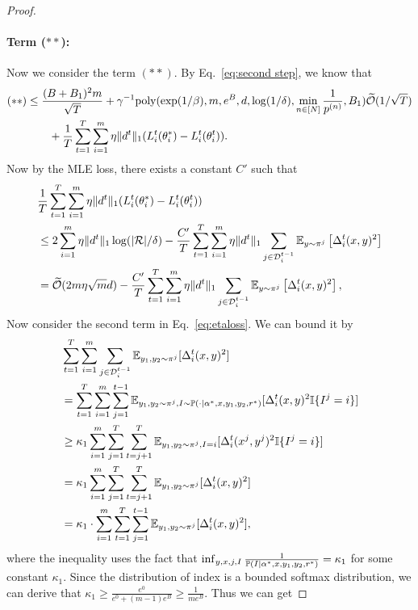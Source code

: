 \begin{proof}
\paragraph{Term ($\ast\ast$):}
Now we consider the term $(\ast\ast)$. 
By Eq.~\eqref{eq:second step}, we know that 
\begin{align}
    (**) &\le \frac{(B+B_1)^2m}{\sqrt{T}} + \gamma^{-1}\mathrm{poly}(\exp(1/\beta), m, e^B, d, \log(1/\delta), \min_{n \in [N]}\frac{1}{p^{(n)}}, B_1)\widetilde{\mathcal{O}}(1/\sqrt{T}) \nonumber\\&\qquad + \frac{1}{T}\sum_{t=1}^T \sum_{i=1}^m \eta \|d^t\|_1 (L_i^t(\theta_i^*) - L_i^t(\theta_i^t)). \label{ineq:bound (**)}
\end{align}
Now by the MLE loss, there exists a constant $C'$ such that 
\begin{align}
    &\frac{1}{T}\sum_{t=1}^T \sum_{i=1}^m \eta \|d^t\|_1(L_i^t(\theta_i^*) - L_i^t(\theta_i^t))
    \nonumber\\&\le 2\sum_{i=1}^m \eta \|d^t\|_1 \log(|\mathcal{R}|/\delta) - \frac{C'}{T}\sum_{t=1}^T \sum_{i=1}^m\eta\|d^t\|_1\sum_{j \in \mathcal{D}_i^{t-1}}\mathbb{E}_{y\sim \pi^j} \left[\Delta_i^t(x,y)^2\right]\nonumber\\
    &=\widetilde{\mathcal{O}}(2m \eta \sqrt{m}d) - \frac{C'}{T}\sum_{t=1}^T \sum_{i=1}^m\eta\|d^t\|_1\sum_{j \in \mathcal{D}_i^{t-1}}\mathbb{E}_{y\sim \pi^j} \left[\Delta_i^t(x,y)^2\right],\label{eq:etaloss}
\end{align}
Now consider the second term in Eq.~\eqref{eq:etaloss}. We can bound it by
\begin{align}&\sum_{t=1}^T \sum_{i=1}^m \sum_{j \in \mathcal{D}_i^{t-1}}\mathbb{E}_{y_1,y_2\sim \pi^j}[\Delta_i^t(x,y)^2]\nonumber \\ &= \sum_{t=1}^T \sum_{i=1}^m \sum_{j=1}^{t-1}\mathbb{E}_{y_1,y_2\sim \pi^j, I \sim \mathbb{P}(\cdot \mid \alpha^*, x,y_1,y_2, r^*)}[\Delta_i^t (x,y)^2 \mathbb{I}\{I^j = i\}]\nonumber\\
    &\ge \kappa_1\sum_{i=1}^m \sum_{j=1}^T \sum_{t=j+1}^T \mathbb{E}_{y_1,y_2\sim \pi^j, I= i}[\Delta_i^t(x^j,y^j)^2 \mathbb{I}\{I^j = i\}]\nonumber\\
    &= \kappa_1\sum_{i=1}^m \sum_{j=1}^T \sum_{t=j+1}^T \mathbb{E}_{y_1,y_2\sim \pi^j} [\Delta_i^t(x,y)^2]\nonumber\\
    &= \kappa_1\cdot \sum_{i=1}^m \sum_{t=1}^T \sum_{j=1}^{t-1}\mathbb{E}_{y_1,y_2\sim \pi^j} [\Delta_i^t(x,y)^2],\label{eq:estimate technique}
\end{align}
where the inequality uses the fact that 
$\inf_{y,x,j, I}\frac{1}{ \mathbb{P}(I\mid \alpha^*, x,y_1,y_2, r^*)} = \kappa_1$ for some constant $\kappa_1.$ Since the distribution of index is a bounded softmax distribution, we can derive that $\kappa_1\ge \frac{e^0}{e^0+(m-1)e^B}\ge \frac{1}{me^B}$. Thus we can get 

\end{proof}
